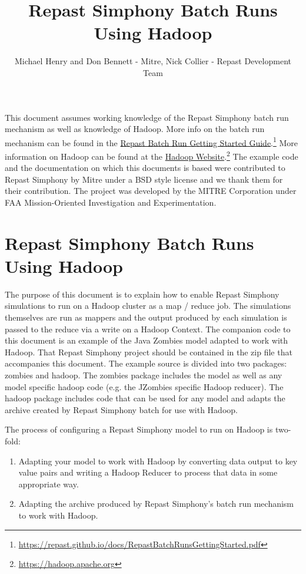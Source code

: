 \documentclass[11pt]{amsart}
\title{Repast Simphony Batch Runs Using Hadoop}
\author{Michael Henry and Don Bennett - Mitre, Nick Collier - Repast Development Team}
\begin{document}
 
\maketitle
\setcounter{section}{-1}



This document assumes working knowledge of the Repast Simphony batch run mechanism as well as knowledge of Hadoop. More info on the batch run mechanism can be found in the \href{https://repast.github.io/docs/RepastBatchRunsGettingStarted.pdf}{Repast Batch Run Getting Started Guide}.\footnote{ \href{https://repast.github.io/docs/RepastBatchRunsGettingStarted.pdf}{https://repast.github.io/docs/RepastBatchRunsGettingStarted.pdf}} More information on Hadoop can be found at the \href{https://hadoop.apache.org}{Hadoop Website}.\footnote{ \href{https://hadoop.apache.org}{https://hadoop.apache.org}} The example code and the documentation on which this documents is based were contributed to Repast Simphony by Mitre under a BSD style license and we thank them for their contribution. The project was developed by the MITRE Corporation under FAA Mission-Oriented Investigation and Experimentation.

\section{Repast Simphony Batch Runs Using Hadoop}
The purpose of this document is to explain how to enable Repast Simphony simulations to run on a Hadoop cluster as a map / reduce job. The simulations themselves are run as mappers and the output produced by each simulation is passed to the reduce via a write on a Hadoop Context. The companion code to this document is an example of the Java Zombies model adapted to work with Hadoop. That Repast Simphony project should be contained in the zip file that accompanies this document. The example source is divided into two packages: zombies and hadoop. The zombies package includes the model as well as any model specific hadoop code (e.g. the JZombies specific Hadoop reducer). The hadoop package includes code that can be used for any model and adapts the archive created by Repast Simphony batch for use with Hadoop.

The process of configuring a Repast Simphony model to run on Hadoop is two-fold:
\begin{enumerate}
\item 
Adapting your model to work with Hadoop by converting data output to key value pairs and writing a Hadoop Reducer to process that data in some appropriate way.
\item
Adapting the archive produced by Repast Simphony's batch run mechanism to work with Hadoop.
\end{enumerate}
\end{document}

